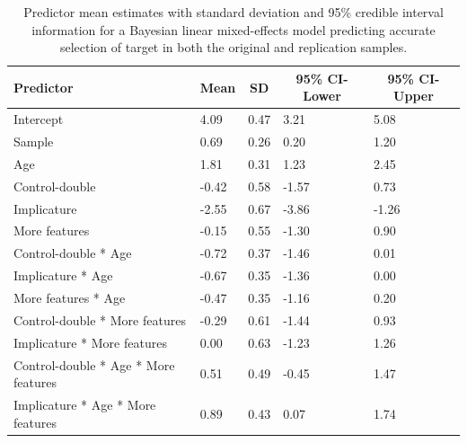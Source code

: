 \documentclass[mask,man]{apa6}
\begin{document}
\begin{table}[tbp]
\begin{center}
\begin{threeparttable}
\caption{\label{tab:brmacc}Predictor mean estimates with standard deviation and 95\% credible interval information for a Bayesian linear mixed-effects model predicting accurate selection of target in both the original and replication samples.}
\begin{tabular}{lllll}
\toprule
Predictor & \multicolumn{1}{c}{Mean} & \multicolumn{1}{c}{SD} & \multicolumn{1}{c}{95\% CI-Lower} & \multicolumn{1}{c}{95\% CI-Upper}\\
\midrule
Intercept & 4.09 & 0.47 & 3.21 & 5.08\\
Sample & 0.69 & 0.26 & 0.20 & 1.20\\
Age & 1.81 & 0.31 & 1.23 & 2.45\\
Control-double & -0.42 & 0.58 & -1.57 & 0.73\\
Implicature & -2.55 & 0.67 & -3.86 & -1.26\\
More features & -0.15 & 0.55 & -1.30 & 0.90\\
Control-double * Age & -0.72 & 0.37 & -1.46 & 0.01\\
Implicature * Age & -0.67 & 0.35 & -1.36 & 0.00\\
More features * Age & -0.47 & 0.35 & -1.16 & 0.20\\
Control-double * More features & -0.29 & 0.61 & -1.44 & 0.93\\
Implicature * More features & 0.00 & 0.63 & -1.23 & 1.26\\
Control-double * Age * More features & 0.51 & 0.49 & -0.45 & 1.47\\
Implicature * Age * More features & 0.89 & 0.43 & 0.07 & 1.74\\
\bottomrule
\end{tabular}
\end{threeparttable}
\end{center}
\end{table}
\end{document}
